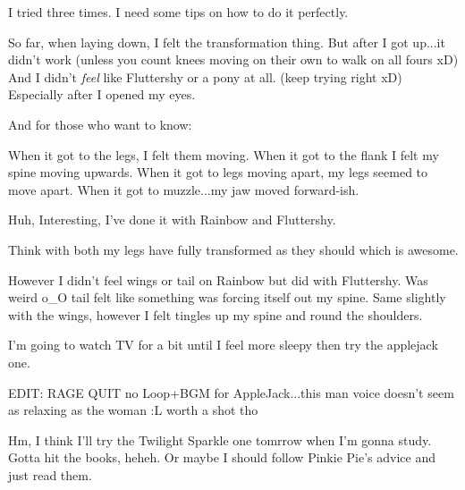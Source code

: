 \documentclass[ebook,12pt,oneside,openany]{memoir}
\newcommand{\mytexttilde}{\raisebox{0.5ex}{\texttildelow}}
\begin{document}
\begin{tcolorbox}[title=\mytexttilde{}Chaotic Parsley\mytexttilde{},colback=cyan!5!white,colframe=cyan!75!black,coltitle=white]
\begin{tcolorbox}[title=Feather Gem]
\par{I tried three times.  I need some tips on how to do it perfectly.}
\par{So far, when laying down, I felt the transformation thing.  But after I got up...it didn't work (unless you count knees moving on their own to walk on all fours xD)  And I didn't \textit{feel }like Fluttershy or a pony at all.  (keep trying right xD)  Especially after I opened my eyes.}
\newline{}
\par{And for those who want to know:}
\par{When it got to the legs, I felt them moving.  When it got to the flank I felt my spine moving upwards.  When it got to legs moving apart, my legs seemed to move apart.  When it got to muzzle...my jaw moved forward-ish.}
\end{tcolorbox}
\par{Huh, Interesting, I've done it with Rainbow and Fluttershy.}
\par{Think with both my legs have fully transformed as they should which is awesome.}
\par{However I didn't feel wings or tail on Rainbow but did with Fluttershy. Was weird o\_O tail felt like something was forcing itself out my spine. Same slightly with the wings, however I felt tingles up my spine and round the shoulders. }
\newline{}
\par{I'm going to watch TV for a bit until I feel more sleepy then try the applejack one. }
\newline{}
\par{EDIT: RAGE QUIT no Loop+BGM for AppleJack...this man voice doesn't seem as relaxing as the woman :L worth a shot tho}
\end{tcolorbox}
\begin{tcolorbox}[title=Shaky Novel]
\par{Hm, I think I'll try the Twilight Sparkle one tomrrow when I'm gonna study. Gotta hit the books, heheh. Or maybe I should follow Pinkie Pie's advice and just read them.}
\end{tcolorbox}
\end{document}
